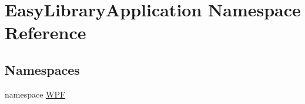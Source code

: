 \hypertarget{namespace_easy_library_application}{}\section{Easy\+Library\+Application Namespace Reference}
\label{namespace_easy_library_application}
\subsection*{Namespaces}
\begin{DoxyCompactItemize}
\item 
namespace \mbox{\hyperlink{namespace_easy_library_application_1_1_w_p_f}{W\+PF}}
\end{DoxyCompactItemize}
